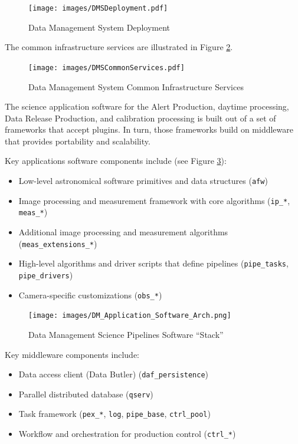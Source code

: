 \documentclass[DM,lsstdraft,toc]{lsstdoc}
\begin{document}
\begin{figure}
\centering
\texttt{[image: images/DMSDeployment.pdf]}
\caption{Data Management System Deployment}
\label{fig:deployment}
\end{figure}

The common infrastructure services are illustrated in Figure \ref{fig:commonservices}.

\begin{figure}
\centering
\texttt{[image: images/DMSCommonServices.pdf]}
\caption{Data Management System Common Infrastructure Services}
\label{fig:commonservices}
\end{figure}

The science application software for the Alert Production, daytime
processing, Data Release Production, and calibration processing is built
out of a set of frameworks that accept plugins. In turn, those
frameworks build on middleware that provides portability and
scalability.

Key applications software components include (see Figure \ref{fig:scipi}):
\begin{itemize}
\item
  Low-level astronomical software primitives and data structures
  (\texttt{afw})
\item
  Image processing and measurement framework with core algorithms
  (\texttt{ip\_*}, \texttt{meas\_*})
\item
  Additional image processing and measurement algorithms
  (\texttt{meas\_extensions\_*})
\item
  High-level algorithms and driver scripts that define pipelines
  (\texttt{pipe\_tasks}, \texttt{pipe\_drivers})
\item
  Camera-specific customizations (\texttt{obs\_*})
\end{itemize}

\begin{figure}
\centering
\texttt{[image: images/DM\_Application\_Software\_Arch.png]}
\caption{Data Management Science Pipelines Software ``Stack''}
\label{fig:scipi}
\end{figure}

Key middleware components include:
\begin{itemize}
\item
  Data access client (Data Butler) (\texttt{daf\_persistence})
\item
  Parallel distributed database (\texttt{qserv})
\item
  Task framework (\texttt{pex\_*}, \texttt{log}, \texttt{pipe\_base},
  \texttt{ctrl\_pool})
\item
  Workflow and orchestration for production control (\texttt{ctrl\_*})
\end{itemize}
\end{document}
